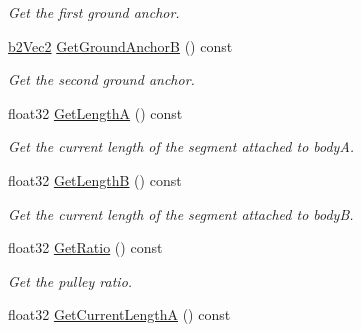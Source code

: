 \begin{DoxyCompactItemize}
\begin{DoxyCompactList}\small\item\em Get the first ground anchor. \end{DoxyCompactList}\item 
\hyperlink{structb2_vec2}{b2\+Vec2} \hyperlink{classb2_pulley_joint_a1b49d0dbce802f19711a9ab6d7dadfee}{Get\+Ground\+AnchorB} () const \hypertarget{classb2_pulley_joint_a1b49d0dbce802f19711a9ab6d7dadfee}{}\label{classb2_pulley_joint_a1b49d0dbce802f19711a9ab6d7dadfee}

\begin{DoxyCompactList}\small\item\em Get the second ground anchor. \end{DoxyCompactList}\item 
float32 \hyperlink{classb2_pulley_joint_a6b4c2e5cb4f5da48fcb074c7b5988084}{Get\+LengthA} () const \hypertarget{classb2_pulley_joint_a6b4c2e5cb4f5da48fcb074c7b5988084}{}\label{classb2_pulley_joint_a6b4c2e5cb4f5da48fcb074c7b5988084}

\begin{DoxyCompactList}\small\item\em Get the current length of the segment attached to bodyA. \end{DoxyCompactList}\item 
float32 \hyperlink{classb2_pulley_joint_abc7f31a35c6fb32647fd15d57e4ce60c}{Get\+LengthB} () const \hypertarget{classb2_pulley_joint_abc7f31a35c6fb32647fd15d57e4ce60c}{}\label{classb2_pulley_joint_abc7f31a35c6fb32647fd15d57e4ce60c}

\begin{DoxyCompactList}\small\item\em Get the current length of the segment attached to bodyB. \end{DoxyCompactList}\item 
float32 \hyperlink{classb2_pulley_joint_a625685e60d95b7c5a725e8586d146752}{Get\+Ratio} () const \hypertarget{classb2_pulley_joint_a625685e60d95b7c5a725e8586d146752}{}\label{classb2_pulley_joint_a625685e60d95b7c5a725e8586d146752}

\begin{DoxyCompactList}\small\item\em Get the pulley ratio. \end{DoxyCompactList}\item 
float32 \hyperlink{classb2_pulley_joint_aa57599ec0d229c3ef95dafa39a277c7b}{Get\+Current\+LengthA} () const \hypertarget{classb2_pulley_joint_aa57599ec0d229c3ef95dafa39a277c7b}{}\label{classb2_pulley_joint_aa57599ec0d229c3ef95dafa39a277c7b}


\end{DoxyCompactItemize}
